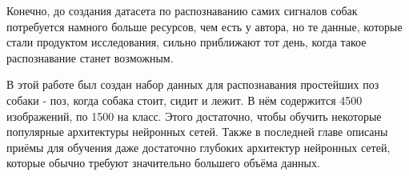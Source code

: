 Конечно, до создания датасета по распознаванию самих сигналов собак потребуется намного больше ресурсов, чем есть у автора, но те данные, которые стали продуктом исследования, сильно приближают тот день, когда такое распознавание станет возможным.

В этой работе был создан набор данных для распознавания простейших поз собаки - поз, когда собака стоит, сидит и лежит. В нём содержится 4500 изображений, по 1500 на класс. Этого достаточно, чтобы обучить некоторые популярные архитектуры нейронных сетей. Также в последней главе описаны приёмы для обучения даже достаточно глубоких архитектур нейронных сетей, которые обычно требуют значительно большего объёма данных.